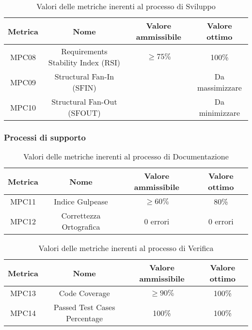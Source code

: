 \documentclass[italian,12pt]{article} %
\begin{document}

\begin{table}[h!]
	\centering
	\begin{tabular}{|c|c|c|c|} 
	 \hline
	 Metrica & Nome & Valore ammissibile & Valore ottimo \\  
	 \hline
	 MPC08 & Requirements Stability Index (RSI) & $\geq 75\% $ & 100\% \\
	 \hline
	 MPC09 & Structural Fan-In (SFIN) &  & Da massimizzare \\ 
	 \hline
	 MPC10 & Structural Fan-Out (SFOUT) &  & Da minimizzare \\ 
	 \hline
	\end{tabular}
	\caption{ Valori delle metriche inerenti al processo di Sviluppo}
	\label{table:2}
	\end{table}

\subsubsection{Processi di supporto}


\begin{table}[h!]
	\centering
	\begin{tabular}{|c|c|c|c|} 
	 \hline
	 Metrica & Nome & Valore ammissibile & Valore ottimo \\  
	 \hline
	 MPC11 & Indice Gulpease & $\geq 60\% $ & 80\% \\
	 \hline
	 MPC12 & Correttezza Ortografica & 0 errori & 0 errori \\ 
	 \hline
	\end{tabular}
	\caption{ Valori delle metriche inerenti al processo di Documentazione}
	\label{table:3}
	\end{table}


\begin{table}[h!]
	\centering
	\begin{tabular}{|c|c|c|c|} 
	 \hline
	 Metrica & Nome & Valore ammissibile & Valore ottimo \\  
	 \hline
	 MPC13 & Code Coverage & $\geq 90\% $ & 100\% \\
	 \hline
	 MPC14 & Passed Test Cases Percentage & 100\% & 100\% \\ 
	 \hline
	\end{tabular}
	\caption{ Valori delle metriche inerenti al processo di Verifica}
	\label{table:4}
	\end{table}
\end{document}
